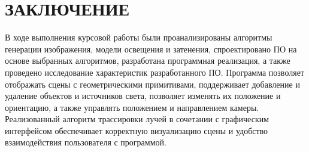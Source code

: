 \chapter*{ЗАКЛЮЧЕНИЕ}

В ходе выполнения курсовой работы были проанализированы алгоритмы генерации изображения, модели освещения и затенения, спроектировано ПО на основе выбранных алгоритмов, разработана программная реализация, а также проведено исследование характеристик разработанного ПО. Программа позволяет отображать сцены с геометрическими примитивами, поддерживает добавление и удаление объектов и источников света, позволяет изменять их положение и ориентацию, а также управлять положением и направлением камеры. Реализованный алгоритм трассировки лучей в сочетании с графическим интерфейсом обеспечивает корректную визуализацию сцены и удобство взаимодействия пользователя с программой.